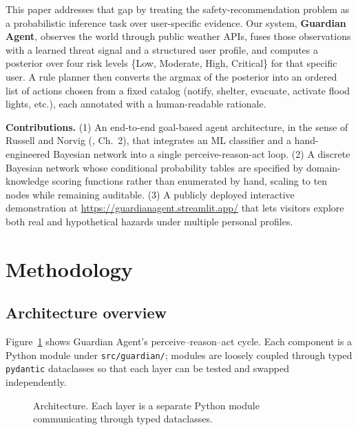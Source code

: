\documentclass{article}
\theoremstyle{plain}
\theoremstyle{definition}
\theoremstyle{remark}
\begin{document}
This paper addresses that gap by treating the safety-recommendation
problem as a probabilistic inference task over user-specific evidence.
Our system, \textbf{Guardian Agent}, observes the world through public
weather APIs, fuses those observations with a learned threat signal and
a structured user profile, and computes a posterior over four risk
levels \{Low, Moderate, High, Critical\} for that specific user. A rule
planner then converts the argmax of the posterior into an ordered list
of actions chosen from a fixed catalog (notify, shelter, evacuate,
activate flood lights, etc.), each annotated with a human-readable
rationale.

\textbf{Contributions.} (1) An end-to-end goal-based agent
architecture, in the sense of Russell and Norvig
(\citeyear{russell2020ai}, Ch.~2), that integrates an ML classifier and a
hand-engineered Bayesian network into a single perceive-reason-act
loop. (2) A discrete Bayesian network whose conditional probability
tables are specified by domain-knowledge scoring functions rather than
enumerated by hand, scaling to ten nodes while remaining auditable. (3)
A publicly deployed interactive demonstration at
\url{https://guardianagent.streamlit.app/} that lets visitors explore
both real and hypothetical hazards under multiple personal profiles.

\section{Methodology}
\label{sec:methodology}

\subsection{Architecture overview}

Figure~\ref{fig:architecture} shows Guardian Agent's perceive--reason--act
cycle. Each component is a Python module under
\texttt{src/guardian/}; modules are loosely coupled through typed
\texttt{pydantic} dataclasses so that each layer can be tested and
swapped independently.

\begin{figure}[t]
\centering
{}
\caption{Architecture. Each layer is a separate Python module
communicating through typed dataclasses.}
\label{fig:architecture}
\end{figure}
\end{document}
